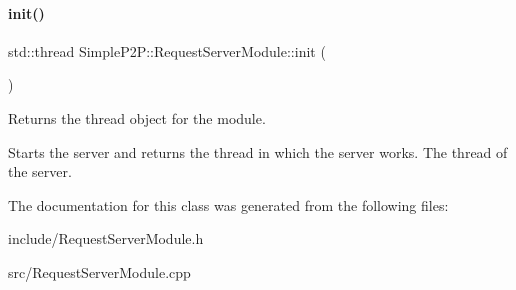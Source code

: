\paragraph{\texorpdfstring{init()}{init()}}
{\footnotesize\ttfamily std\+::thread Simple\+P2\+P\+::\+Request\+Server\+Module\+::init (\begin{DoxyParamCaption}{ }\end{DoxyParamCaption})}



Returns the thread object for the module. 

Starts the server and returns the thread in which the server works. The thread of the server. 

The documentation for this class was generated from the following files\+:\begin{DoxyCompactItemize}
\item 
include/Request\+Server\+Module.\+h\item 
src/Request\+Server\+Module.\+cpp\end{DoxyCompactItemize}
